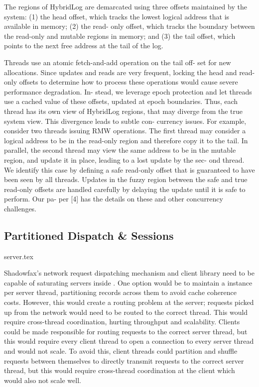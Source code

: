 {The regions of HybridLog are demarcated using three offsets maintained
by the system: (1) the head offset, which tracks the lowest logical
address that is available in memory; (2) the read- only offset, which
tracks the boundary between the read-only and mutable regions in memory;
and (3) the tail offset, which points to the next free address at the
tail of the log.

Threads use an atomic fetch-and-add operation on the tail off- set for
new allocations. Since updates and reads are very frequent, locking the
head and read-only offsets to determine how to process these operations
would cause severe performance degradation. In- stead, we leverage epoch
protection and let threads use a cached value of these offsets, updated
at epoch boundaries. Thus, each thread has its own view of HybridLog
regions, that may diverge from the true system view. This divergence
leads to subtle con- currency issues. For example, consider two threads
issuing RMW operations. The first thread may consider a logical address
to be in the read-only region and therefore copy it to the tail. In
parallel, the second thread may view the same address to be in the
mutable region, and update it in place, leading to a lost update by the
sec- ond thread. We identify this case by defining a safe read-only
offset that is guaranteed to have been seen by all threads. Updates in
the fuzzy region between the safe and true read-only offsets are handled
carefully by delaying the update until it is safe to perform. Our pa-
per [4] has the details on these and other concurrency challenges.
}
\fi

\subsection{Partitioned Dispatch \& Sessions}
\label{sec:dispatch}

 {server.tex}

Shadowfax's network request dispatching mechanism and client library need to be
capable of saturating servers inside \faster.
%
One option would be to maintain a \faster instance per server thread,
partitioning records across them to avoid cache coherence costs.
%
However, this would create a routing problem at the server; requests
picked up from the network would need to be routed to the correct thread.
%
This would require cross-thread coordination, hurting throughput and
scalability.
%
Clients could be made responsible for routing requests to the correct
server thread, but this would require every client thread to open a
connection to every server thread and would not scale.
%
To avoid this, client threads could partition and shuffle requests between
themselves to directly transmit requests to the correct server thread, but this would
require cross-thread coordination at the client which would also not scale well.

